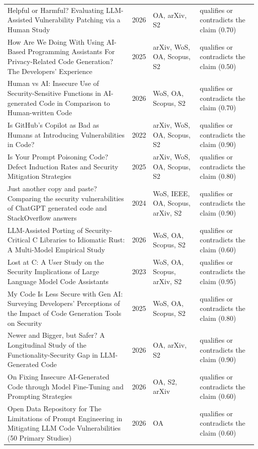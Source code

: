 \begin{longtable}{@{}%
  >{\raggedright\arraybackslash}p{}c%
  >{\raggedright\arraybackslash}p{}%
  >{\raggedright\arraybackslash}p{}@{}}
Helpful or Harmful? Evaluating LLM-Assisted Vulnerability Patching via a Human Study & 2026 & OA, arXiv, S2 & qualifies or contradicts the claim (0.70) \\
How Are We Doing With Using AI-Based Programming Assistants For Privacy-Related Code Generation? The Developers' Experience & 2025 & arXiv, WoS, OA, Scopus, S2 & qualifies or contradicts the claim (0.50) \\
Human vs AI: Insecure Use of Security-Sensitive Functions in AI-generated Code in Comparison to Human-written Code & 2026 & WoS, OA, Scopus, S2 & qualifies or contradicts the claim (0.70) \\
Is GitHub's Copilot as Bad as Humans at Introducing Vulnerabilities in Code? & 2022 & arXiv, WoS, OA, Scopus, S2 & qualifies or contradicts the claim (0.90) \\
Is Your Prompt Poisoning Code? Defect Induction Rates and Security Mitigation Strategies & 2025 & arXiv, WoS, OA, Scopus, S2 & qualifies or contradicts the claim (0.80) \\
Just another copy and paste? Comparing the security vulnerabilities of ChatGPT generated code and StackOverflow answers & 2024 & WoS, IEEE, OA, Scopus, arXiv, S2 & qualifies or contradicts the claim (0.90) \\
LLM-Assisted Porting of Security-Critical C Libraries to Idiomatic Rust: A Multi-Model Empirical Study & 2026 & WoS, OA, Scopus, S2 & qualifies or contradicts the claim (0.60) \\
Lost at C: A User Study on the Security Implications of Large Language Model Code Assistants & 2023 & WoS, OA, Scopus, arXiv, S2 & qualifies or contradicts the claim (0.95) \\
My Code Is Less Secure with Gen AI: Surveying Developers' Perceptions of the Impact of Code Generation Tools on Security & 2025 & WoS, OA, Scopus, S2 & qualifies or contradicts the claim (0.80) \\
Newer and Bigger, but Safer? A Longitudinal Study of the Functionality-Security Gap in LLM-Generated Code & 2026 & OA, arXiv, S2 & qualifies or contradicts the claim (0.90) \\
On Fixing Insecure AI-Generated Code through Model Fine-Tuning and Prompting Strategies & 2026 & OA, S2, arXiv & qualifies or contradicts the claim (0.60) \\
Open Data Repository for \textquotedbl{}The Limitations of Prompt Engineering in Mitigating LLM Code Vulnerabilities\textquotedbl{} (50 Primary Studies) & 2026 & OA & qualifies or contradicts the claim (0.60) \\

\end{longtable}
